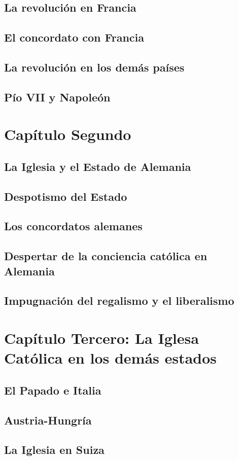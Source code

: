 \raggedbottom{} \documentclass[12pt, a4paper]{book}
\begin{document}
\section{La revolución en Francia}
\section{El concordato con Francia}
\section{La revolución en los demás países}
\section{Pío VII y Napoleón}
\chapter{Capítulo Segundo}
\section{La Iglesia y el Estado de Alemania}
\section{Despotismo del Estado}
\section{Los concordatos alemanes}
\section{Despertar de la conciencia católica en Alemania}
\section{Impugnación del regalismo y el liberalismo}
\chapter{Capítulo Tercero: La Iglesa Católica en los demás estados}
\section{El Papado e Italia}
\section{Austria-Hungría}
\section{La Iglesia en Suiza}
\end{document}
